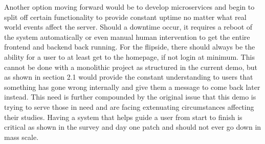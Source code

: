 \newline
\newline
Another option moving forward would be to develop microservices and begin to split off certain functionality to provide constant uptime no matter what real world events affect the server. Should a downtime occur, it requires a reboot of the system automatically or even manual human intervention to get the entire frontend and backend back running. For the flipside, there should always be the ability for a user to at least get to the homepage, if not login at minimum. This cannot be done with a monolithic project as structured in the current demo, but as shown in section 2.1 would provide the constant understanding to users that something has gone wrong internally and give them a message to come back later instead. This need is further compounded by the original issue that this demo is trying to serve those in need and are facing extenuating circumstances affecting their studies. Having a system that helps guide a user from start to finish is critical as shown in the survey and day one patch and should not ever go down in mass scale.